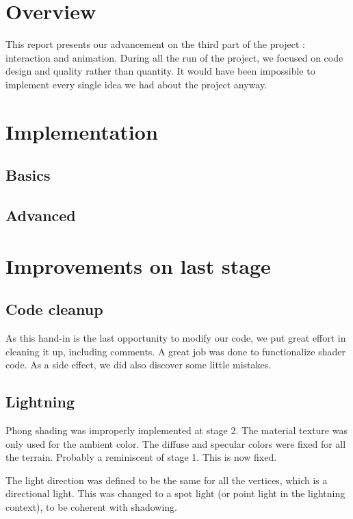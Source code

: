 \documentclass[a4paper,11pt]{article}
\begin{document}
\section{Overview}

This report presents our advancement on the third part of the project : interaction and animation. During all the run of the project, we focused on code design and quality rather than quantity. It would have been impossible to implement every single idea we had about the project anyway.


\section{Implementation}

\subsection{Basics}

\subsection{Advanced}


\section{Improvements on last stage}

\subsection{Code cleanup}

As this hand-in is the last opportunity to modify our code, we put great effort in cleaning it up, including comments. A great job was done to functionalize shader code. As a side effect, we did also discover some little mistakes.

\subsection{Lightning}

Phong shading was improperly implemented at stage 2. The material texture was only used for the ambient color. The diffuse and specular colors were fixed for all the terrain. Probably a reminiscent of stage 1. This is now fixed.

The light direction was defined to be the same for all the vertices, which is a directional light. This was changed to a spot light (or point light in the lightning context), to be coherent with shadowing.
\end{document}
